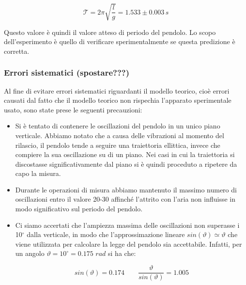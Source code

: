 \begin{equation}
    \mathcal{T} = 2\pi \sqrt{\frac{l}{g}} = 1.533 \pm 0.003 \, s 
\end{equation}

Questo valore è quindi il valore atteso di periodo del pendolo. Lo scopo
dell'esperimento è quello di verificare sperimentalmente se questa predizione
è corretta.

\subsubsection{Errori sistematici (spostare???)}

Al fine di evitare errori sistematici riguardanti il modello teorico,
cioè errori causati dal fatto che il modello teorico non rispechia l'apparato
sperimentale usato, sono state prese le seguenti precauzioni:

\begin{itemize}
    \item{Si è tentato di contenere le oscillazioni del pendolo in un
        unico piano verticale. Abbiamo notato che a causa delle
        vibrazioni al momento del rilascio, il pendolo tende a seguire una
        traiettoria ellittica, invece che compiere la sua oscillazione su di un piano.
        Nei casi in cui la traiettoria si discostasse significativamente dal piano
        si è quindi proceduto a ripetere da capo la misura.}
    
    \item{Durante le operazioni di misura abbiamo mantenuto il massimo numero
        di oscillazioni entro il valore 20-30 affinché l'attrito con l'aria
        non influisse in modo significativo sul periodo del pendolo.}

    \item{Ci siamo accertati che l'ampiezza massima delle
        oscillazioni non superasse i 10$^\circ$ dalla verticale, in modo che
        l'approssimazione lineare $sin(\vartheta) \simeq \vartheta$ che viene
        utilizzata per calcolare la legge del pendolo sia accettabile. Infatti, per un
        angolo $\vartheta = 10^\circ = 0.175 \,\, rad$ si ha che:}

    \begin{equation}
        sin(\vartheta) = 0.174 \qquad \frac{\vartheta}{sin(\vartheta)} = 1.005
        \label{eq:theta_su_sintheta}
    \end{equation}

\end{itemize}

